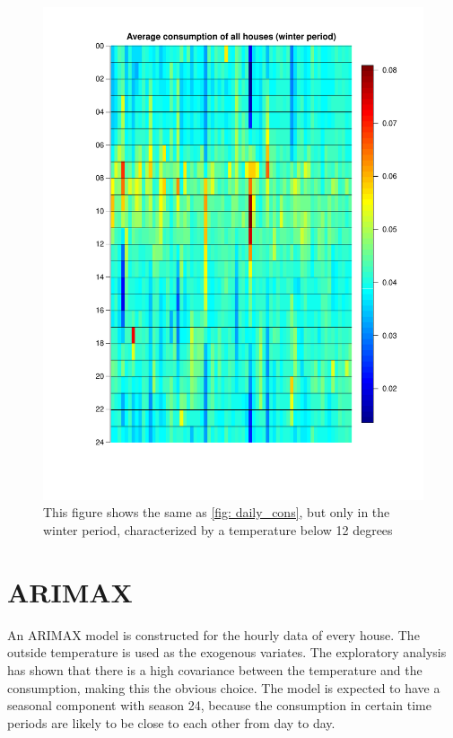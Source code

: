 \begin{figure}
    \centering
    \includegraphics[width=\textwidth]{../../../figures/Heatmap_winter.pdf}
    \caption{This figure shows the same as \cref{fig: daily_cons}, but only in the winter period, characterized by a temperature below 12 degrees}
    \label{fig: Hourcons_winter}
\end{figure}







\section{ARIMAX}
An ARIMAX model is constructed for the hourly data of every house. The outside temperature is used as the exogenous variates. The exploratory analysis has shown that there is a high covariance between the temperature and the consumption, making this the obvious choice. The model is expected to have a seasonal component with season 24, because the consumption in certain time periods are likely to be close to each other from day to day.

